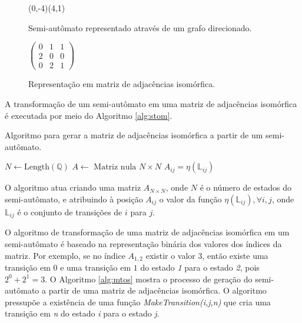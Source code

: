 \documentclass[12pt,a4paper]{article}
\begin{document}
\begin{figure}[ht]
\begin{minipage}[b]{0.5\linewidth}
\begin{center}
\begin{VCPicture}{(0,-4)(4,1)}
 
  
 
\end{VCPicture}
\caption{Semi-autômato representado através de um grafo direcionado.}
\label{fig:semigraph}
\end{center}
\end{minipage}
\hspace{0.5cm}
\begin{minipage}[b]{0.5\linewidth}
\begin{center}
\begin{math}
\begin{pmatrix}
0 & 1 & 1 \\
2 & 0 & 0 \\
0 & 2 & 1
\end{pmatrix}
\end{math}
\caption{Representação em matriz de adjacências isomórfica.}
\label{fig:iadjm}
\end{center}
\end{minipage}
\end{figure}

A transformação de um semi-autômato em uma matriz de adjacências
isomórfica é executada por meio do Algoritmo \ref{alg:stom}.

\begin{algorithm}
\caption{Algoritmo para gerar a matriz de adjacências isomórfica a partir
de um semi-autômato.}
\label{alg:stom}
\begin{algorithmic}
\STATE $N \leftarrow \mbox{Length}(\mathbb{Q})$ 
\STATE $A \leftarrow \mbox{ Matriz nula } N \times N$
\STATE $A_{ij} = \eta(\mathbb{\mathbb{L}}_{ij})$
\ENDIF
\ENDFOR
\end{algorithmic}
\end{algorithm}

O algoritmo atua criando uma matriz $A_{N \times N}$, onde $N$ é o número
de estados do semi-autômato, e atribuindo à posição $A_{ij}$ o valor
da função $\eta(\mathbb{L}_{ij}),\forall i,j$, onde $\mathbb{L}_{ij}$
é o conjunto de transições de $i$ para $j$.

O algoritmo de transformação de uma matriz de adjacências isomórfica em
um semi-autômato é baseado na representação binária dos valores dos
índices da matriz. Por exemplo, se no índice $A_{1,2}$ existir o valor
$3$, então existe uma transição em $0$ e uma transição em $1$ do estado
\emph{1} para o estado \emph{2}, pois $2^0+2^1=3$. O Algoritmo \ref{alg:mtos}
mostra o processo de geração do semi-autômato a partir de uma matriz de
adjacências isomórfica. O algoritmo pressupõe a existência de uma função
\emph{MakeTransition(i,j,n)} que cria uma transição em \emph{n} do estado
\emph{i} para o estado \emph{j}.
\end{document}
